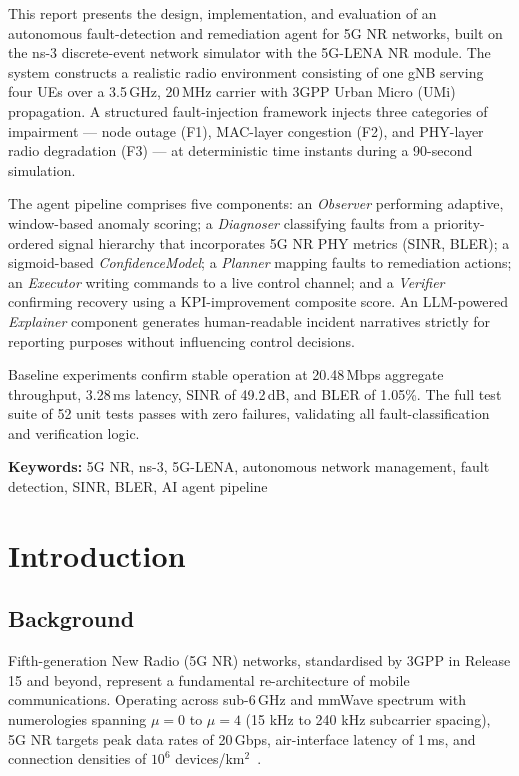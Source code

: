\documentclass[12pt,a4paper]{article}
\begin{document}
This report presents the design, implementation, and evaluation of an autonomous
fault-detection and remediation agent for 5G NR networks, built on the ns-3
discrete-event network simulator with the 5G-LENA NR module. The system
constructs a realistic radio environment consisting of one gNB serving four UEs
over a 3.5\,GHz, 20\,MHz carrier with 3GPP Urban Micro (UMi) propagation. A
structured fault-injection framework injects three categories of impairment ---
node outage (F1), MAC-layer congestion (F2), and PHY-layer radio degradation
(F3) --- at deterministic time instants during a 90-second simulation.

The agent pipeline comprises five components: an \emph{Observer} performing
adaptive, window-based anomaly scoring; a \emph{Diagnoser} classifying faults
from a priority-ordered signal hierarchy that incorporates 5G NR PHY metrics
(SINR, BLER); a sigmoid-based \emph{ConfidenceModel}; a \emph{Planner} mapping
faults to remediation actions; an \emph{Executor} writing commands to a live
control channel; and a \emph{Verifier} confirming recovery using a
KPI-improvement composite score. An LLM-powered \emph{Explainer} component
generates human-readable incident narratives strictly for reporting purposes
without influencing control decisions.

Baseline experiments confirm stable operation at 20.48\,Mbps aggregate
throughput, 3.28\,ms latency, SINR of 49.2\,dB, and BLER of 1.05\%. The full
test suite of 52 unit tests passes with zero failures, validating all
fault-classification and verification logic.

\vspace{4pt}
\textbf{Keywords:} 5G NR, ns-3, 5G-LENA, autonomous network management,
fault detection, SINR, BLER, AI agent pipeline

\newpage

\section{Introduction}

\subsection{Background}

Fifth-generation New Radio (5G NR) networks, standardised by 3GPP in Release 15
and beyond, represent a fundamental re-architecture of mobile communications.
Operating across sub-6\,GHz and mmWave spectrum with numerologies spanning
\(\mu = 0\) to \(\mu = 4\) (15 kHz to 240 kHz subcarrier spacing), 5G NR
targets peak data rates of 20\,Gbps, air-interface latency of 1\,ms, and
connection densities of \(10^6\) devices/km$^2$~\cite{3gpp38300}.
\end{document}
